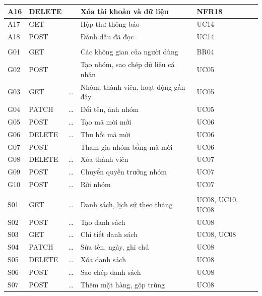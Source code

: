 {\begin{longtable}{|C{0.8cm}|C{1.8cm}|L{5.4cm}|L{\dimexpr{}\arrayrulewidth-0.8cm-1.8cm-5.4cm-1.85cm\relax}|C{1.85cm}|}
A16 & DELETE &  & Xóa tài khoản và dữ liệu & NFR18\\ \hline
A17 & GET &  & Hộp thư thông báo & UC14\\ \hline
A18 & POST &  & Đánh dấu đã đọc & UC14\\ \hline
{}\\ \hline
G01 & GET &  & Các không gian của người dùng & BR04\\ \hline
G02 & POST &  & Tạo nhóm, sao chép dữ liệu cá nhân & UC05\\ \hline
G03 & GET & \ldots & Nhóm, thành viên, hoạt động gần đây & UC05\\ \hline
G04 & PATCH & \ldots & Đổi tên, ảnh nhóm & UC05\\ \hline
G05 & POST & \ldots{} & Tạo mã mời mới & UC06\\ \hline
G06 & DELETE & \ldots{} & Thu hồi mã mời & UC06\\ \hline
G07 & POST &  & Tham gia nhóm bằng mã mời & UC06\\ \hline
G08 & DELETE & \ldots{} & Xóa thành viên & UC07\\ \hline
G09 & POST & \ldots{} & Chuyển quyền trưởng nhóm & UC07\\ \hline
G10 & POST & \ldots{} & Rời nhóm & UC07\\ \hline
{}\\ \hline
S01 & GET & \ldots{} & Danh sách, lịch sử theo tháng & UC08, UC10, UC08\\ \hline
S02 & POST & \ldots{} & Tạo danh sách & UC08\\ \hline
S03 & GET & \ldots{} & Chi tiết danh sách & UC08, UC08\\ \hline
S04 & PATCH & \ldots{} & Sửa tên, ngày, ghi chú & UC08\\ \hline
S05 & DELETE & \ldots{} & Xóa danh sách & UC08\\ \hline
S06 & POST & \ldots{} & Sao chép danh sách & UC08\\ \hline
S07 & POST & \ldots{} & Thêm mặt hàng, gộp trùng & UC08\\ \hline

\end{longtable}}
